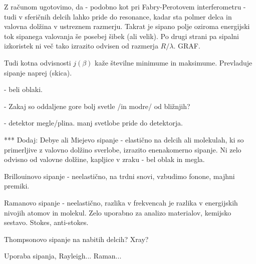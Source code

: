 Z računom ugotovimo, da - podobno kot pri Fabry-Perotovem interferometru - tudi v sferičnih delcih
lahko pride do resonance, kadar sta polmer delca in valovna dolžina v ustreznem razmerju. Takrat 
je sipano polje oziroma energijski tok sipanega valovanja še posebej šibek (ali velik). Po drugi
strani  pa sipalni izkoristek ni več tako izrazito odvisen od razmerja $R/\lambda$. GRAF. 

Tudi kotna odvisnosti $j(\beta)$ kaže številne minimume in maksimume. Prevladuje sipanje naprej (skica).


- beli oblaki.

- Zakaj so oddaljene gore bolj svetle /in modre/ od bližnjih?

- detektor megle/plina. manj svetlobe pride do detektorja.

***
Dodaj: 
Debye ali Miejevo sipanje - elastično na delcih ali molekulah, ki so primerljive
z valovno dolžino sverlobe, izrazito enenakomerno sipanje. Ni zelo odvisno od
valovne dolžine, kapljice v zraku - bel oblak in megla. 

Brillouinovo sipanje - neelastično, na trdni snovi, vzbudimo fonone, majhni premiki.

Ramanovo sipanje - neelastično, razlika v frekvencah je razlika v energijskih 
nivojih atomov in molekul. Zelo uporabno za analizo materialov, kemijsko sestavo.
Stokes, anti-stokes. 

Thompsonovo sipanje na nabitih delcih? Xray?

Uporaba sipanja, Rayleigh... Raman... 
